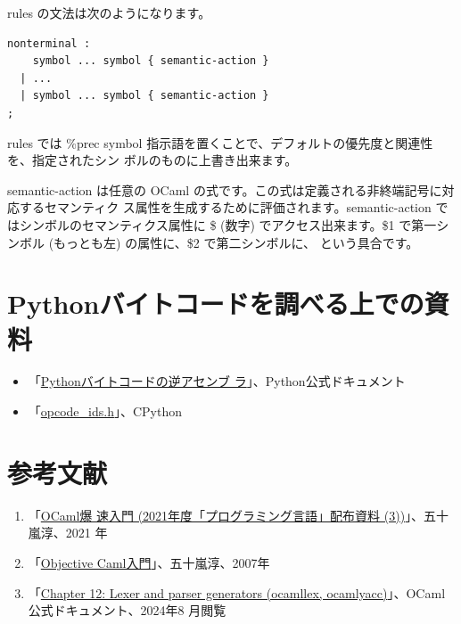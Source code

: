\documentclass[a4paper,11pt]{jsarticle}
\begin{document}
rules の文法は次のようになります。

\begin{lstlisting}
nonterminal :
    symbol ... symbol { semantic-action }
  | ...
  | symbol ... symbol { semantic-action }
;
\end{lstlisting}

rules では \%prec symbol 指示語を置くことで、デフォルトの優先度と関連性を、指定されたシン
ボルのものに上書き出来ます。

semantic-action は任意の OCaml の式です。この式は定義される非終端記号に対応するセマンティク
ス属性を生成するために評価されます。semantic-action ではシンボルのセマンティクス属性に \$
(数字) でアクセス出来ます。\$1 で第一シンボル (もっとも左) の属性に、\$2 で第二シンボルに、
という具合です。

\newpage
\section{Pythonバイトコードを調べる上での資料}

\begin{itemize}
\item
  「\href{https://docs.python.org/ja/2.7/library/dis.html}{Pythonバイトコードの逆アセンブ
    ラ}」、Python公式ドキュメント
\item


  「\href{https://github.com/python/cpython/blob/main/Include/opcode_ids.h}{opcode\_ids.h}」、CPython
\end{itemize}



\section{参考文献}

\begin{enumerate}
\item 「\href{https://www.fos.kuis.kyoto-u.ac.jp/~igarashi/class/pl/03-ocaml.pdf}{OCaml爆
    速入門 (2021年度「プログラミング言語」配布資料 (3))}」、五十嵐淳、2021
  年
\item
  「\href{https://www.fos.kuis.kyoto-u.ac.jp/~igarashi/class/isle4-11w/mltext.pdf}{Objective Caml入門}」、五十嵐淳、2007年
\item 「\href{https://ocaml.jp/archive/ocaml-manual-3.06-ja/manual026.html}{Chapter 12:
    Lexer and parser generators (ocamllex, ocamlyacc)}」、OCaml 公式ドキュメント、2024年8
  月閲覧
\end{enumerate}
\end{document}
